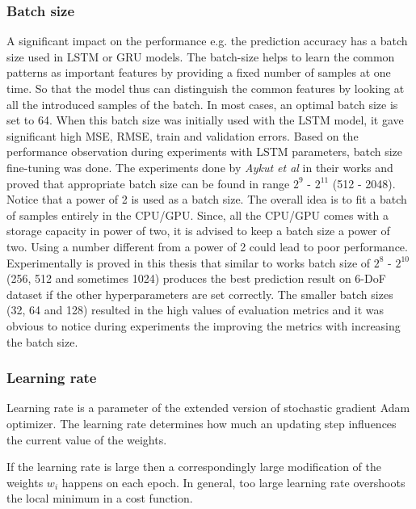 \subsubsection{Batch size}
\label{sec:eval:experiments:early:batch}
A significant impact on the performance e.g. the prediction accuracy has a batch size used in LSTM or GRU models. The batch-size helps to learn the common patterns as important features by providing a fixed number of samples at one time. So that the model thus can distinguish the common features by looking at all the introduced samples of the batch. In most cases, an optimal batch size is set to 64. When this batch size was initially used with the LSTM model, it gave significant high MSE, RMSE, train and validation errors. Based on the performance observation during experiments with LSTM parameters, batch size fine-tuning was done. The experiments done by \textit{Aykut et al} in their works \cite{delay_compensation_360} and \cite{telepresence} proved that appropriate batch size can be found in range $2^{9}$ - $2^{11}$ (512 - 2048). Notice that a power of 2 is used as a batch size. The overall idea is to fit a batch of samples entirely in the CPU/GPU. Since, all the CPU/GPU comes with a storage capacity in power of two, it is advised to keep a batch size a power of two. Using a number different from a power of 2 could lead to poor performance. Experimentally is proved in this thesis that similar to works \cite{delay_compensation_360, telepresence}  batch size of $2^{8}$ - $2^{10}$ (256, 512 and sometimes 1024) produces the best prediction result on 6-DoF dataset if the other hyperparameters are set correctly. The smaller batch sizes (32, 64 and 128) resulted in the high values of evaluation metrics and it was obvious to notice during experiments the improving the metrics with increasing the batch size.

\subsubsection{Learning rate}
\label{sec:eval:experiments:early:lr}
Learning rate is a parameter of the extended version of stochastic gradient Adam optimizer. The learning rate determines how much an updating step influences the current value of the weights. 

If the learning rate is large then a correspondingly large modification of the weights $w_i$ happens on each epoch. In general, too large learning rate overshoots the local minimum in a cost function.

